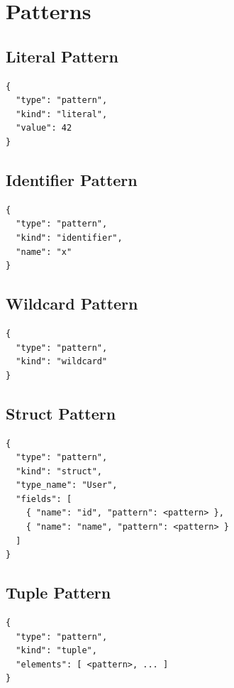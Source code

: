 \section{Patterns}

\subsection{Literal Pattern}

\begin{lstlisting}[language={}]
{
  "type": "pattern",
  "kind": "literal",
  "value": 42
}
\end{lstlisting}

\subsection{Identifier Pattern}

\begin{lstlisting}[language={}]
{
  "type": "pattern",
  "kind": "identifier",
  "name": "x"
}
\end{lstlisting}

\subsection{Wildcard Pattern}

\begin{lstlisting}[language={}]
{
  "type": "pattern",
  "kind": "wildcard"
}
\end{lstlisting}

\subsection{Struct Pattern}

\begin{lstlisting}[language={}]
{
  "type": "pattern",
  "kind": "struct",
  "type_name": "User",
  "fields": [
    { "name": "id", "pattern": <pattern> },
    { "name": "name", "pattern": <pattern> }
  ]
}
\end{lstlisting}

\subsection{Tuple Pattern}

\begin{lstlisting}[language={}]
{
  "type": "pattern",
  "kind": "tuple",
  "elements": [ <pattern>, ... ]
}
\end{lstlisting}

